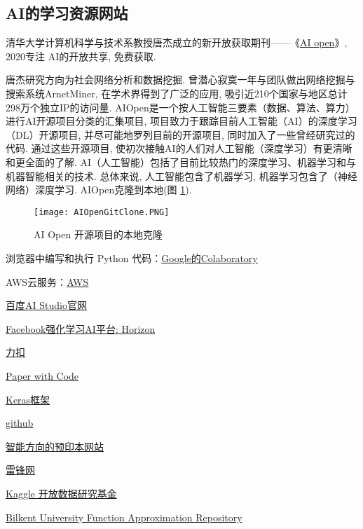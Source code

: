 \subsection{AI的学习资源网站}
清华大学计算机科学与技术系教授唐杰成立的新开放获取期刊——《\href{https://www.aiopens.net/main/index.html}{AI open}》, 2020专注 AI的开放共享, 免费获取.

\begin{remark}
唐杰研究方向为社会网络分析和数据挖掘. 曾潜心寂寞一年与团队做出网络挖掘与搜索系统ArnetMiner, 在学术界得到了广泛的应用, 吸引近210个国家与地区总计298万个独立IP的访问量.
AIOpen是一个按人工智能三要素（数据、算法、算力）进行AI开源项目分类的汇集项目, 项目致力于跟踪目前人工智能（AI）的深度学习（DL）开源项目, 并尽可能地罗列目前的开源项目, 同时加入了一些曾经研究过的代码.
通过这些开源项目, 使初次接触AI的人们对人工智能（深度学习）有更清晰和更全面的了解.
AI（人工智能）包括了目前比较热门的深度学习、机器学习和与机器智能相关的技术.
总体来说, 人工智能包含了机器学习, 机器学习包含了（神经网络）深度学习.
AIOpen克隆到本地(图 \ref{AIOpenGitClone2020030801}).
\end{remark}
\begin{figure}[H]
\centering
\texttt{[image: AIOpenGitClone.PNG]}
\caption{AI Open 开源项目的本地克隆}
\label{AIOpenGitClone2020030801}
\end{figure}
浏览器中编写和执行 Python 代码：\href{https://colab.research.google.com/notebooks/intro.ipynb}{Google的Colaboratory}

AWS云服务：\href{https://aws.amazon.com/cn/}{AWS}

\href{http://aistudio.baidu.com/#/projectoverview}{百度AI Studio官网}

\href{https://github.com/openstack/horizon}{Facebook强化学习AI平台: Horizon}

\href{https://leetcode-cn.com/problemset/all/}{力扣}

\href{https://www.paperswithcode.com/}{Paper with Code}

\href{https://keras.io/zh/}{Keras框架}

\href{https://github.com/}{github}

\href{https://arxiv.org/}{智能方向的预印本网站}

\href{https://www.leiphone.com/category/ai}{雷锋网}

\href{https://www.kaggle.com/}{Kaggle 开放数据研究基金}

\href{http://funapp.cs.bilkent.edu.tr/DataSets/}{Bilkent University Function Approximation Repository}

